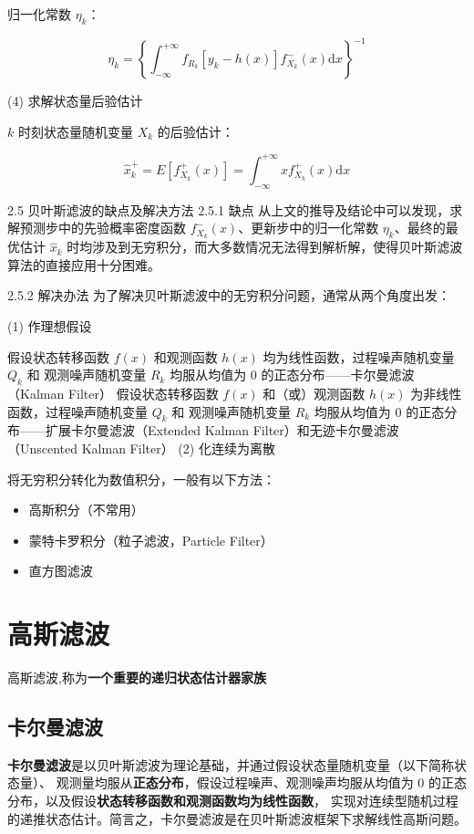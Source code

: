 \documentclass[12pt]{ctexart}
\begin{document}
归一化常数 \(\eta_k\)：

\[\eta_k=\left\{\int_{-\infty}^{+\infty}f_{R_k}[y_k-h(x)]f_{X_k}^-(x)\mathrm{d}x\right\}^{-1}\]

(4) 求解状态量后验估计

\(k\) 时刻状态量随机变量 \(X_k\) 的后验估计：

\[\hat{x}_k^+=E[f_{X_k}^+(x)]=\int_{-\infty}^{+\infty}xf_{X_k}^+(x)\mathrm{d}x\]

2.5 贝叶斯滤波的缺点及解决方法
2.5.1 缺点
从上文的推导及结论中可以发现，求解预测步中的先验概率密度函数 \(f_{X_k}^-(x)\)、更新步中的归一化常数 \(\eta_k\)、最终的最优估计 \(\hat{x}_k\) 时均涉及到无穷积分，而大多数情况无法得到解析解，使得贝叶斯滤波算法的直接应用十分困难。

2.5.2 解决办法
为了解决贝叶斯滤波中的无穷积分问题，通常从两个角度出发：

(1) 作理想假设

假设状态转移函数 \(f(x)\) 和观测函数 \(h(x)\) 均为线性函数，过程噪声随机变量 \(Q_k\) 和 观测噪声随机变量 \(R_k\) 均服从均值为 0 的正态分布——卡尔曼滤波（Kalman Filter）
假设状态转移函数 \(f(x)\) 和（或）观测函数 \(h(x)\) 为非线性函数，过程噪声随机变量 \(Q_k\) 和 观测噪声随机变量 \(R_k\) 均服从均值为 0 的正态分布——扩展卡尔曼滤波（Extended Kalman Filter）和无迹卡尔曼滤波（Unscented Kalman Filter）
(2) 化连续为离散

将无穷积分转化为数值积分，一般有以下方法：

\begin{itemize}
    \item 高斯积分（不常用）
    \item 蒙特卡罗积分（粒子滤波，Particle Filter）
    \item 直方图滤波
\end{itemize}



\section{高斯滤波}
高斯滤波,称为\textbf{一个重要的递归状态估计器家族}
\subsection{卡尔曼滤波}
\textbf{卡尔曼滤波}是以贝叶斯滤波为理论基础，并通过假设状态量随机变量（以下简称状态量）、
观测量均服从\textbf{正态分布}，假设过程噪声、观测噪声均服从均值为 0 的正态分布，以及假设\textbf{状态转移函数和观测函数均为线性函数}，
实现对连续型随机过程的递推状态估计。简言之，卡尔曼滤波是在贝叶斯滤波框架下求解线性高斯问题。
\end{document}
